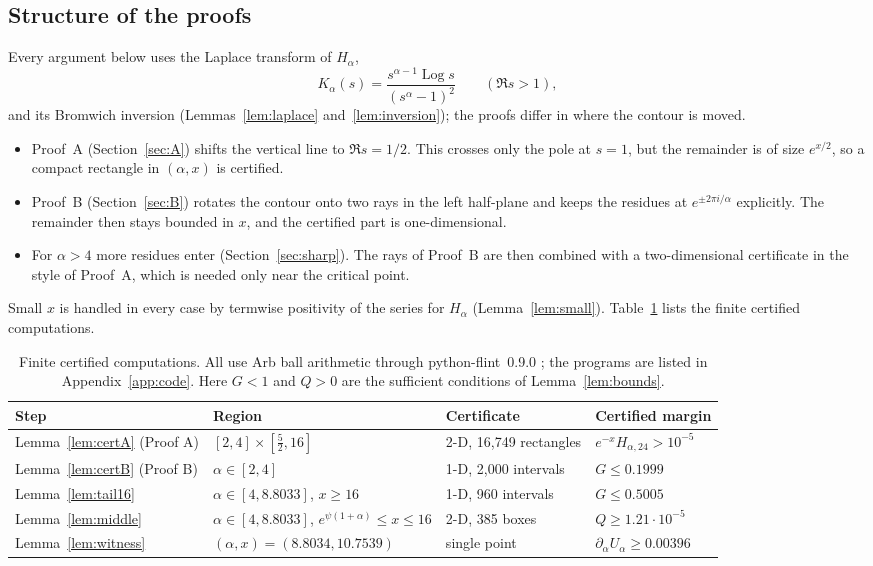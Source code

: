 \documentclass[11pt,a4paper]{article}
\theoremstyle{plain}
\theoremstyle{remark}
\DeclareMathOperator{\Log}{Log}
\begin{document}
\subsection{Structure of the proofs}
Every argument below uses the Laplace transform of $H_\alpha$,
\[
 K_\alpha(s)=\frac{s^{\alpha-1}\Log s}{(s^\alpha-1)^2}\qquad(\Re s>1),
\]
and its Bromwich inversion (Lemmas~\ref{lem:laplace} and~\ref{lem:inversion}); the proofs differ
in where the contour is moved.
\begin{itemize}
 \item Proof~A (Section~\ref{sec:A}) shifts the vertical line to $\Re s=1/2$. This crosses only
 the pole at $s=1$, but the remainder is of size $e^{x/2}$, so a compact rectangle in $(\alpha,x)$
 is certified.
 \item Proof~B (Section~\ref{sec:B}) rotates the contour onto two rays in the left half-plane and
 keeps the residues at $e^{\pm2\pi i/\alpha}$ explicitly. The remainder then stays bounded in $x$,
 and the certified part is one-dimensional.
 \item For $\alpha>4$ more residues enter (Section~\ref{sec:sharp}). The rays of Proof~B are then
 combined with a two-dimensional certificate in the style of Proof~A, which is needed only near the
 critical point.
\end{itemize}
Small $x$ is handled in every case by termwise positivity of the series for $H_\alpha$
(Lemma~\ref{lem:small}). Table~\ref{tab:cert} lists the finite certified computations.

\begin{table}[ht]\centering\small\setlength{\tabcolsep}{4pt}
\begin{tabular}{llll}
\toprule
Step & Region & Certificate & Certified margin\\
\midrule
Lemma~\ref{lem:certA} (Proof A) & $[2,4]\times[\frac52,16]$ & 2-D, 16{,}749 rectangles &
 $e^{-x}H_{\alpha,24}>10^{-5}$\\
Lemma~\ref{lem:certB} (Proof B) & $\alpha\in[2,4]$ & 1-D, 2{,}000 intervals & $G\le0.1999$\\
Lemma~\ref{lem:tail16} & $\alpha\in[4,8.8033]$, $x\ge16$ & 1-D, 960 intervals & $G\le0.5005$\\
Lemma~\ref{lem:middle} & $\alpha\in[4,8.8033]$, $e^{\psi(1+\alpha)}\le x\le16$ & 2-D, 385 boxes &
 $Q\ge1.21\cdot10^{-5}$\\
Lemma~\ref{lem:witness} & $(\alpha,x)=(8.8034,10.7539)$ & single point &
 $\partial_\alpha U_\alpha\ge0.00396$\\
\bottomrule
\end{tabular}
\caption{Finite certified computations. All use Arb ball arithmetic \cite{Arb} through
python-flint~0.9.0 \cite{flint}; the programs are listed in Appendix~\ref{app:code}. Here
$G<1$ and $Q>0$ are the sufficient conditions of Lemma~\ref{lem:bounds}.}\label{tab:cert}
\end{table}
\end{document}
